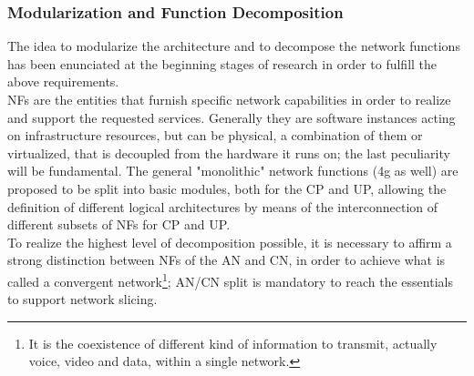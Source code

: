 \documentclass[a4paper,12pt]{report} %
\begin{document}
\subsubsection{Modularization and Function Decomposition}
The idea to modularize the architecture and to decompose the network functions has been enunciated at the beginning stages of research
in order to fulfill the above requirements.\\ 
\gls{NF}s are the entities
that furnish specific network capabilities in order to realize and support the requested services. Generally they are
software instances acting on infrastructure
resources, but can be physical, a combination
of them or virtualized, that is decoupled from the hardware it runs on; the last peculiarity will be fundamental. The general "monolithic" network functions (4g as well) are proposed to be split into basic modules, both for the \gls{CP} and \gls{UP}, allowing the definition of different logical architectures by means of the interconnection of
different subsets of NFs for CP and UP.\\
To realize the highest level of decomposition possible, it is necessary to affirm a strong distinction between NFs of
the \gls{AN} and CN, in order to achieve what is called a convergent network\footnote{It is the coexistence of different kind of information to transmit, actually voice, video and data, within a single network.}; AN/CN split is mandatory to reach  the essentials to support network
­slicing. \cite{al20185g} \cite{marsch20185g}
\end{document}
